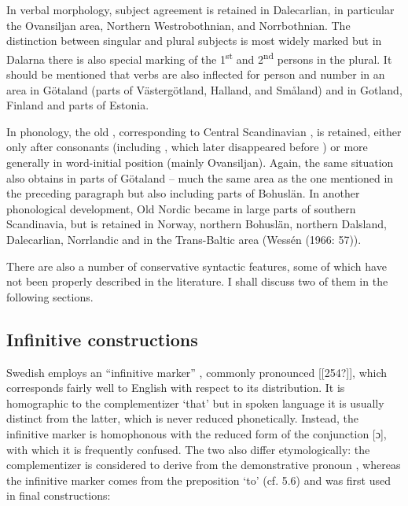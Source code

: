 In verbal morphology, subject agreement is retained in Dalecarlian, in particular the Ovansiljan area, Northern Westrobothnian, and Norrbothnian. The distinction between singular and plural subjects is most widely marked but in Dalarna there is also special marking of the 1\textsuperscript{st} and 2\textsuperscript{nd} persons in the plural. It should be mentioned that verbs are also inflected for person and number in an area in Götaland (parts of Västergötland, Halland, and Småland) and in Gotland, Finland and parts of Estonia.




In phonology, the old , corresponding to Central Scandinavian , is retained, either only after consonants (including , which later disappeared before ) or more generally in word-initial position (mainly Ovansiljan). Again, the same situation also obtains in parts of Götaland – much the same area as the one mentioned in the preceding paragraph but also including parts of Bohuslän. In another phonological development, Old Nordic  became in large parts of southern Scandinavia, but is retained in Norway, northern Bohuslän, northern Dalsland, Dalecarlian, Norrlandic and in the Trans-Baltic area (Wessén (1966: 57)).




There are also a number of conservative syntactic features, some of which have not been properly described in the literature. I shall discuss two of them in the following sections.



\subsection{Infinitive constructions}
\label{bkm:Ref218337377}
Swedish employs an “infinitive marker” , commonly pronounced [[254?]], which corresponds fairly well to English with respect to its distribution. It is homographic to the complementizer  ‘that’ but in spoken language it is usually distinct from the latter, which is never reduced phonetically. Instead, the infinitive marker is homophonous with the reduced form of the conjunction  [ɔ], with which it is frequently confused. The two  also differ etymologically: the complementizer is considered to derive from the demonstrative pronoun , whereas the infinitive marker comes from the preposition  ‘to’ (cf. 5.6) and was first used in final constructions: 

